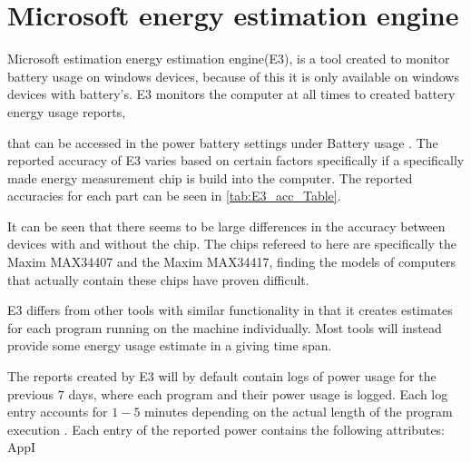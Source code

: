 \section{Microsoft energy estimation engine}
Microsoft estimation energy estimation engine(E3), is a tool created to monitor battery usage on windows devices, because of this it is only available on windows devices with battery's. E3 monitors the computer at all times to created battery energy usage reports, 

that can be accessed in the power battery settings under Battery usage \cite[p.43]{E3WinHec}. The reported accuracy of E3 varies based on certain factors specifically if a specifically made energy measurement chip is build into the computer. The reported accuracies for each part can be seen in \cref{tab:E3_acc_Table}. 


It can be seen that there seems to be large differences in the accuracy between devices with and without the chip. The chips refereed to here are specifically the Maxim MAX34407 and the Maxim MAX34417, finding the models of computers that actually contain these chips have proven difficult. 

E3 differs from other tools with similar functionality in that it creates estimates for each program running on the machine individually. Most tools will instead provide some energy usage estimate in a giving time span. 

The reports created by E3 will by default contain logs of power usage for the previous $7$ days, where each program and their power usage is logged. Each log entry accounts for $1-5$ minutes depending on the actual length of the program execution \cite[]{E3Video}. Each entry of the reported power contains the following attributes:
AppI

